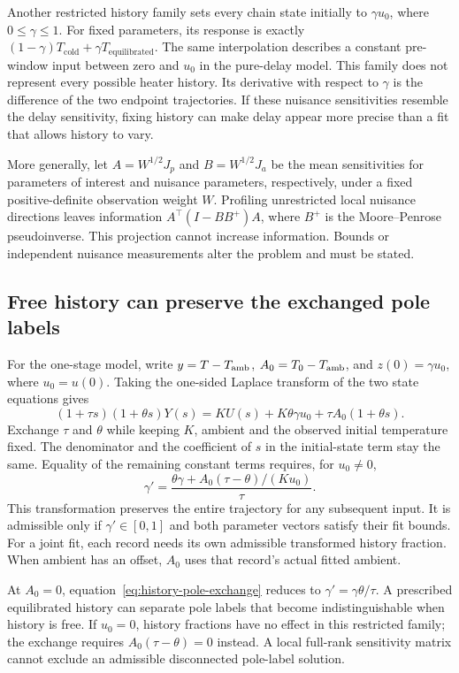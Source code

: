 Another restricted history family sets every chain state initially to
$\gamma u_0$, where $0\leq\gamma\leq1$. For fixed parameters, its response is
exactly $(1-\gamma)T_{\mathrm{cold}}+\gamma T_{\mathrm{equilibrated}}$.
The same interpolation describes a constant pre-window input between zero and
$u_0$ in the pure-delay model. This family does not represent every possible
heater history. Its derivative with respect to $\gamma$ is the difference of
the two endpoint trajectories. If these nuisance sensitivities resemble the
delay sensitivity, fixing history can make delay appear more precise than a
fit that allows history to vary.

More generally, let $A=W^{1/2}J_p$ and $B=W^{1/2}J_a$ be the mean sensitivities
for parameters of interest and nuisance parameters, respectively, under a fixed
positive-definite observation weight $W$. Profiling unrestricted local nuisance
directions leaves information $A^\top(I-BB^+)A$, where $B^+$ is the
Moore--Penrose pseudoinverse. This projection cannot increase information.
Bounds or independent nuisance measurements alter the problem and must be stated.

\subsection{Free history can preserve the exchanged pole labels}
For the one-stage model, write $y=T-T_{\mathrm{amb}}$, $A_0=T_0-T_{\mathrm{amb}}$, and
$z(0)=\gamma u_0$, where $u_0=u(0)$. Taking the one-sided Laplace transform
of the two state equations gives
\[
 (1+\tau s)(1+\theta s)Y(s)
 =K U(s)+K\theta\gamma u_0+\tau A_0(1+\theta s).
\]
Exchange $\tau$ and $\theta$ while keeping $K$, ambient and the observed
initial temperature fixed. The denominator and the coefficient of $s$ in the
initial-state term stay the same. Equality of the remaining constant terms
requires, for $u_0\ne0$,
\begin{equation}
 \gamma'=\frac{\theta\gamma+A_0(\tau-\theta)/(K u_0)}{\tau}.
 \label{eq:history-pole-exchange}
\end{equation}
This transformation preserves the entire trajectory for any subsequent input.
It is admissible only if $\gamma'\in[0,1]$ and both parameter vectors satisfy
their fit bounds. For a joint fit, each record needs its own admissible
transformed history fraction. When ambient has an offset, $A_0$ uses that
record's actual fitted ambient.

At $A_0=0$, equation~\eqref{eq:history-pole-exchange} reduces to
$\gamma'=\gamma\theta/\tau$. A prescribed equilibrated history can separate
pole labels that become indistinguishable when history is free. If $u_0=0$,
history fractions have no effect in this restricted family; the exchange
requires $A_0(\tau-\theta)=0$ instead. A local full-rank sensitivity matrix
cannot exclude an admissible disconnected pole-label solution.

